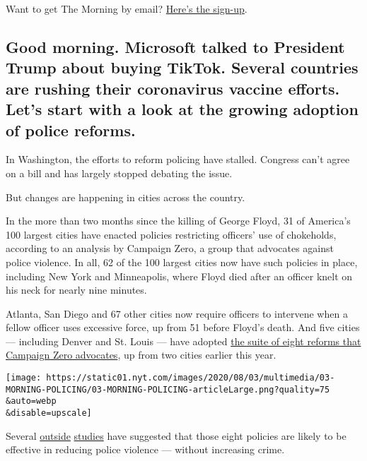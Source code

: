 Want to get The Morning by email?
\href{https://www.nytimes.com/newsletters/morning-briefing}{Here's the
sign-up}.

\hypertarget{good-morning-microsoft-talked-to-president-trump-about-buying-tiktok-several-countries-are-rushing-their-coronavirus-vaccine-efforts-lets-start-with-a-look-at-the-growing-adoption-of-police-reforms}{%
\subsection{Good morning. Microsoft talked to President Trump about
buying TikTok. Several countries are rushing their coronavirus vaccine
efforts. Let's start with a look at the growing adoption of police
reforms.}\label{good-morning-microsoft-talked-to-president-trump-about-buying-tiktok-several-countries-are-rushing-their-coronavirus-vaccine-efforts-lets-start-with-a-look-at-the-growing-adoption-of-police-reforms}}

In Washington, the efforts to reform policing have stalled. Congress
can't agree on a bill and has largely stopped debating the issue.

But changes are happening in cities across the country.

In the more than two months since the killing of George Floyd, 31 of
America's 100 largest cities have enacted policies restricting officers'
use of chokeholds, according to an analysis by Campaign Zero, a group
that advocates against police violence. In all, 62 of the 100 largest
cities now have such policies in place, including New York and
Minneapolis, where Floyd died after an officer knelt on his neck for
nearly nine minutes.

Atlanta, San Diego and 67 other cities now require officers to intervene
when a fellow officer uses excessive force, up from 51 before Floyd's
death. And five cities --- including Denver and St. Louis --- have
adopted \href{https://8cantwait.org/}{the suite of eight reforms that
Campaign Zero advocates}, up from two cities earlier this year.

\texttt{[image: https://static01.nyt.com/images/2020/08/03/multimedia/03-MORNING-POLICING/03-MORNING-POLICING-articleLarge.png?quality=75\\\&auto=webp\\\&disable=upscale]}

Several
\href{https://www.ncjrs.gov/pdffiles1/nij/grants/218583.pdf}{outside}
\href{https://static1.squarespace.com/static/5425b9f0e4b0d66352331e0e/t/58e6a753ff7c50ebbad126f8/1491511130661/Ninth+Systemic+Assessment--Use+of+Force--FINAL.pdf}{studies}
have suggested that those eight policies are likely to be effective in
reducing police violence --- without increasing crime.

